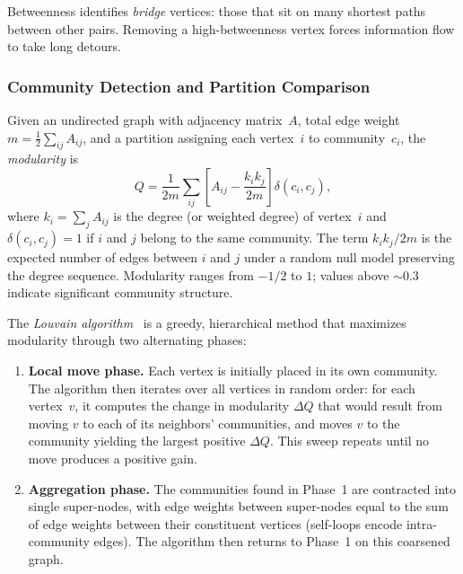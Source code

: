 Betweenness identifies \emph{bridge} vertices: those that sit on many shortest paths between other pairs. Removing a high-betweenness vertex forces information flow to take long detours.

\subsubsection{Community Detection and Partition Comparison}
\label{sec:prelim-community}

\begin{definition}
\label{def:modularity}
Given an undirected graph with adjacency matrix~$A$, total edge weight $m = \frac{1}{2}\sum_{ij} A_{ij}$, and a partition assigning each vertex~$i$ to community~$c_i$, the \emph{modularity} is
\[
  Q = \frac{1}{2m} \sum_{ij} \left[ A_{ij} - \frac{k_i k_j}{2m} \right] \delta(c_i, c_j),
\]
where $k_i = \sum_j A_{ij}$ is the degree (or weighted degree) of vertex~$i$ and $\delta(c_i, c_j) = 1$ if $i$ and $j$ belong to the same community. The term $k_i k_j / 2m$ is the expected number of edges between $i$ and $j$ under a random null model preserving the degree sequence. Modularity ranges from $-1/2$ to $1$; values above ${\sim}0.3$ indicate significant community structure.
\end{definition}

The \emph{Louvain algorithm}~\cite{blondel2008} is a greedy, hierarchical method that maximizes modularity through two alternating phases:

\begin{enumerate}
\item \textbf{Local move phase.} Each vertex is initially placed in its own community. The algorithm then iterates over all vertices in random order: for each vertex~$v$, it computes the change in modularity $\Delta Q$ that would result from moving $v$ to each of its neighbors' communities, and moves $v$ to the community yielding the largest positive $\Delta Q$. This sweep repeats until no move produces a positive gain.

\item \textbf{Aggregation phase.} The communities found in Phase~1 are contracted into single super-nodes, with edge weights between super-nodes equal to the sum of edge weights between their constituent vertices (self-loops encode intra-community edges). The algorithm then returns to Phase~1 on this coarsened graph.
\end{enumerate}

